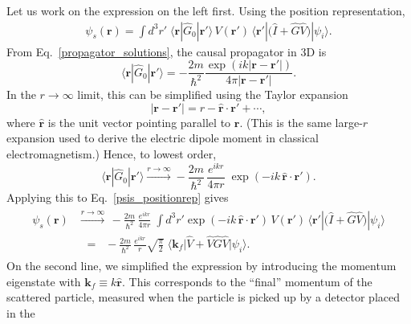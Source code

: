 \documentclass[prx,12pt]{revtex4-2}
\begin{document}
Let us work on the expression on the left first.  Using the position
representation,
\begin{align}
  \psi_s(\mathbf{r}) = \int d^3r'\; \langle\mathbf{r}|\hat{G}_0|\mathbf{r}'\rangle\, V(\mathbf{r}')\, \langle \mathbf{r}'| \big(\hat{I} + \hat{G} \hat{V}\big) |\psi_i\rangle.
  \label{psis_positionrep}
\end{align}
From Eq.~\eqref{propagator_solutions}, the causal propagator in 3D is
\begin{equation}
  \langle\mathbf{r}|\hat{G}_0|\mathbf{r}'\rangle =
  - \frac{2m}{\hbar^2}
  \frac{\exp\left(ik|\mathbf{r}-\mathbf{r}'|\right)}{4\pi|\mathbf{r}-\mathbf{r}'|}.
\end{equation}
In the $r\rightarrow\infty$ limit, this can be simplified using the
Taylor expansion
\begin{equation}
  |\mathbf{r} - \mathbf{r}'| = r - \hat{\mathbf{r}} \cdot \mathbf{r}' + \cdots,
\end{equation}
where $\hat{\mathbf{r}}$ is the unit vector pointing parallel to
$\mathbf{r}$.  (This is the same large-$r$ expansion used to derive
the electric dipole moment in classical electromagnetism.)  Hence, to
lowest order,
\begin{equation}
  \langle\mathbf{r}|\hat{G}_0|\mathbf{r}'\rangle \overset{r\rightarrow\infty}{\longrightarrow} - \frac{2m}{\hbar^2}\, \frac{e^{ikr}}{4\pi r}\; \exp\left(-ik \, \hat{\mathbf{r}} \cdot \mathbf{r}'\right).
\end{equation}
Applying this to Eq.~\eqref{psis_positionrep} gives
\begin{align}
  \begin{aligned}\psi_s(\mathbf{r})
    &\overset{r\rightarrow\infty}{\longrightarrow} \, - \frac{2m}{\hbar^2} \, \frac{e^{ikr}}{4\pi r}\; \int d^3r' \exp\left(-ik \, \hat{\mathbf{r}} \cdot \mathbf{r}'\right)\, V(\mathbf{r}')\,
    \langle \mathbf{r}'| \big(\hat{I} + \hat{G} \hat{V}\big) |\psi_i\rangle \\
    &\;\;=\;\; - \frac{2m}{\hbar^2} \, \frac{e^{ikr}}{r} \sqrt{\frac{\pi}{2}} \; \big\langle \mathbf{k}_f \big|\hat{V} + \hat{V} \hat{G} \hat{V}
    \big|\psi_i\big\rangle. \end{aligned}
  \label{psis_intermediate}
\end{align}
On the second line, we simplified the expression by introducing the
momentum eigenstate with $\mathbf{k}_f \equiv k \hat{\mathbf{r}}$.
This corresponds to the ``final'' momentum of the scattered particle,
measured when the particle is picked up by a detector placed in the
\end{document}
